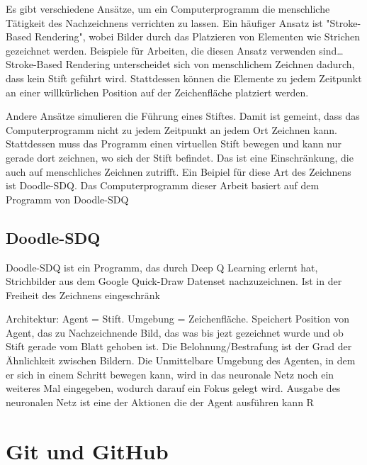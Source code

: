 Es gibt verschiedene Ansätze, um ein Computerprogramm die menschliche Tätigkeit
des Nachzeichnens verrichten zu lassen. Ein häufiger Ansatz ist "Stroke-Based
Rendering", wobei Bilder durch das Platzieren von Elementen wie Strichen
gezeichnet werden. Beispiele für Arbeiten, die diesen Ansatz verwenden sind\dots
Stroke-Based Rendering unterscheidet sich von menschlichem Zeichnen dadurch,
dass kein Stift geführt wird. Stattdessen können die Elemente zu jedem Zeitpunkt
an einer willkürlichen Position auf der Zeichenfläche platziert werden.

Andere Ansätze simulieren die Führung eines Stiftes. Damit ist gemeint, dass das
Computerprogramm nicht zu jedem Zeitpunkt an jedem Ort Zeichnen kann.
Stattdessen muss das Programm einen virtuellen Stift bewegen und kann nur gerade
dort zeichnen, wo sich der Stift befindet. Das ist eine Einschränkung, die auch
auf menschliches Zeichnen zutrifft. Ein Beipiel für diese Art des Zeichnens ist
Doodle-SDQ. Das Computerprogramm dieser Arbeit basiert auf dem Programm von
Doodle-SDQ 

\subsection*{Doodle-SDQ}
Doodle-SDQ ist ein Programm, das durch Deep Q Learning erlernt hat, Strichbilder
aus dem Google Quick-Draw Datenset nachzuzeichnen. Ist in der Freiheit des
Zeichnens eingeschränk\indent 

Architektur: Agent = Stift. Umgebung = Zeichenfläche. Speichert Position von
Agent, das zu Nachzeichnende Bild, das was bis jezt gezeichnet wurde und ob
Stift gerade vom Blatt gehoben ist. Die Belohnung/Bestrafung ist der Grad der
Ähnlichkeit zwischen Bildern. Die Unmittelbare Umgebung des Agenten, in dem er
sich in einem Schritt bewegen kann, wird in das neuronale Netz noch ein weiteres
Mal eingegeben, wodurch darauf ein Fokus gelegt wird. Ausgabe des neuronalen
Netz ist eine der Aktionen die der Agent ausführen kann
R

\section{Git und GitHub}
\label{chap:t_git}



